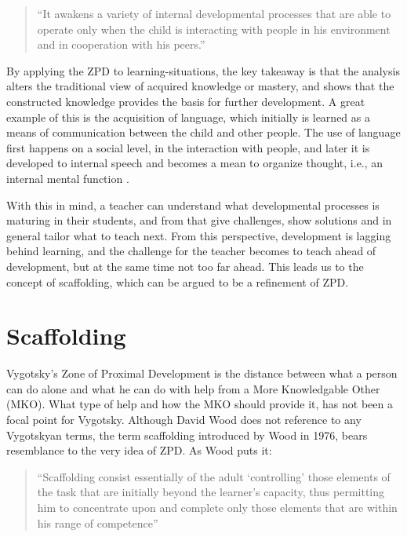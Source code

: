 \begin{quote}“It awakens a variety of internal developmental processes that are able to operate only when the child is interacting with people  in  his  environment  and  in  cooperation  with his peers.” \citep[p. 90]{vygotskiui1978mind}
\end{quote}

By applying the ZPD to learning-situations, the key takeaway is that the analysis alters the traditional view of acquired knowledge or mastery, and shows that the constructed knowledge provides the basis for further development. A great example of this is the acquisition of language, which initially is learned as a means of communication between the child and other people. The use of language first happens on a social level, in the interaction with people, and later it is developed to internal speech and becomes a mean to organize thought, i.e., an internal mental function \citep[p. 89]{vygotskiui1978mind}.

With this in mind, a teacher can understand what developmental processes is maturing in their students, and from that give challenges, show solutions and in general tailor what to teach next. From this perspective, development is lagging behind learning, and the challenge for the teacher becomes to teach ahead of development, but at the same time not too far ahead. This leads us to the concept of scaffolding, which can be argued to be a refinement of ZPD.

\section{Scaffolding}
Vygotsky’s Zone of Proximal Development is the distance between what a person can do alone and what he can do with help from a More Knowledgable Other (MKO). What type of help and how the MKO should provide it, has not been a focal point for Vygotsky. Although David Wood does not reference to any Vygotskyan terms, the term scaffolding introduced by Wood in 1976, bears resemblance to the very idea of ZPD. As Wood puts it:

\begin{quote}“Scaffolding consist essentially of the adult ‘controlling’ those elements of the task that are initially beyond the learner’s capacity, thus permitting him to concentrate upon and complete only those elements that are within his range of competence” \citep{wood1976role}
\end{quote}

